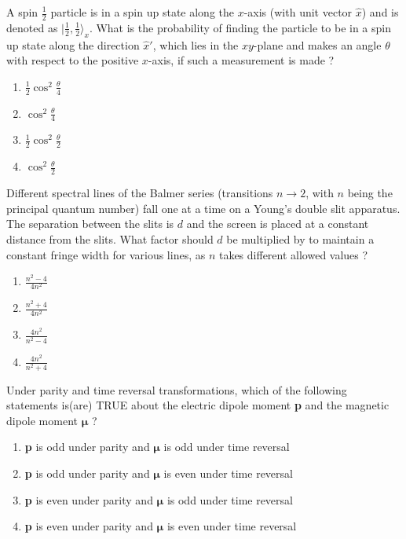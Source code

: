 \iffalse
\chapter{2023}
\author{AI24BTECH11009}
\section{ph}
\fi

\item A spin $\frac{1}{2}$ particle is in a spin up state along the $x$-axis (with unit vector $\hat{x}$) and is denoted as $\bigg|\frac{1}{2},\frac{1}{2}\rangle_x$. What is the probability of finding the particle to be in a
spin up state along the direction $\hat{x}'$, which lies in the $xy$-plane and makes an angle $\theta$ with respect to the positive $x$-axis, if such a measurement is made ?
\begin{enumerate}
    \item $\frac{1}{2}\cos^2\frac{\theta}{4}$
    \item $\cos^2\frac{\theta}{4}$
    \item $\frac{1}{2}\cos^2\frac{\theta}{2}$
    \item $\cos^2\frac{\theta}{2}$ \\
\end{enumerate}
\item Different spectral lines of the Balmer series (transitions $n \rightarrow 2$, with $n$ being the principal quantum number) fall one at a time on a Young's double slit apparatus. The separation between the slits is $d$ and the screen is placed at a constant distance from the slits. What factor should $d$ be multiplied by to maintain a constant fringe width for various lines, as $n$ takes different allowed values ? 
\begin{enumerate}
    \item $\frac{n^2 - 4}{4n^2}$
    \item $\frac{n^2 + 4}{4n^2}$
    \item $\frac{4n^2}{n^2 - 4}$
    \item $\frac{4n^2}{n^2 + 4}$ \\
\end{enumerate}
\item Under parity and time reversal transformations, which of the following statements is(are) TRUE about the electric dipole moment \textbf{p} and the magnetic dipole moment $\boldsymbol{\mu}$ ?  
\begin{enumerate}
    \item \textbf{p} is odd under parity and $\boldsymbol{\mu}$ is odd under time reversal
    \item \textbf{p} is odd under parity and $\boldsymbol{\mu}$ is even under time reversal
    \item \textbf{p} is even under parity and $\boldsymbol{\mu}$ is odd under time reversal
    \item \textbf{p} is even under parity and $\boldsymbol{\mu}$ is even under time reversal \\
\end{enumerate}

